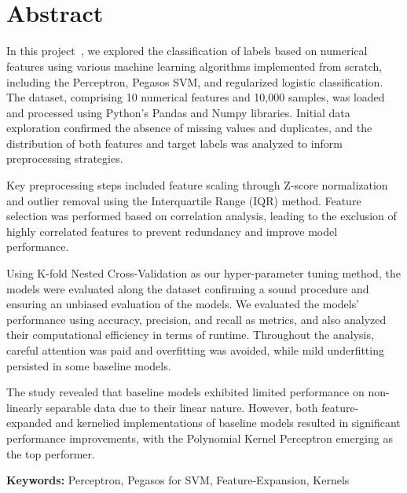 \vspace*{-0.7cm}
    \hspace{-7mm}\vspace{2pt} \underline{\ProjectTitle} \\
    \textit{\AuthorName} \\
\vspace*{-0.7cm}

\section*{Abstract}


In this project~\cite{tabaraei2024github}, we explored the classification of labels based on numerical features using various machine learning algorithms implemented from scratch, including the Perceptron, Pegasos SVM, and regularized logistic classification. The dataset, comprising 10 numerical features and 10,000 samples, was loaded and processed using Python's Pandas and Numpy libraries. Initial data exploration confirmed the absence of missing values and duplicates, and the distribution of both features and target labels was analyzed to inform preprocessing strategies.

Key preprocessing steps included feature scaling through Z-score normalization and outlier removal using the Interquartile Range (IQR) method. Feature selection was performed based on correlation analysis, leading to the exclusion of highly correlated features to prevent redundancy and improve model performance.

Using K-fold Nested Cross-Validation as our hyper-parameter tuning method, the models were evaluated along the dataset confirming a sound procedure and ensuring an unbiased evaluation of the models. We evaluated the models' performance using accuracy, precision, and recall as metrics, and also analyzed their computational efficiency in terms of runtime. Throughout the analysis, careful attention was paid and overfitting was avoided, while mild underfitting persisted in some baseline models.

The study revealed that baseline models exhibited limited performance on non-linearly separable data due to their linear nature. However, both feature-expanded and kernelied implementations of baseline models resulted in significant performance improvements, with the Polynomial Kernel Perceptron emerging as the top performer. 

\noindent \textbf{Keywords:} Perceptron, Pegasos for SVM, Feature-Expansion, Kernels



\vfill
\begin{center}
    \UniversityName \\
    \CurriculumDate \\
\end{center}
\newpage